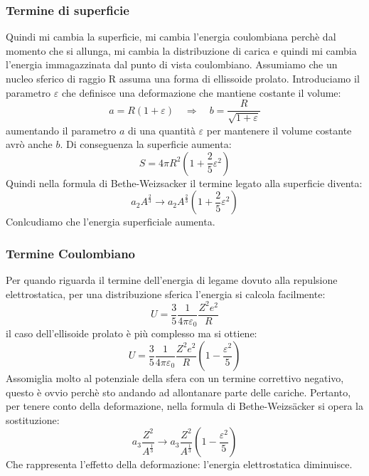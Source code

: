 \subsubsection{Termine di superficie}
Quindi mi cambia la superficie, mi cambia l'energia coulombiana perchè dal momento che si allunga, mi cambia la distribuzione di carica e quindi mi cambia l'energia immagazzinata dal punto di vista coulombiano.
Assumiamo che un nucleo sferico di raggio R assuma una forma di ellissoide prolato. Introduciamo il parametro $\varepsilon$ che definisce una deformazione che mantiene costante il volume:
\begin{equation*}
    a=R(1+\varepsilon) \quad \Rightarrow \quad b=\frac{R}{\sqrt{1+\varepsilon}}
\end{equation*}
aumentando il parametro $a$ di una quantità $\varepsilon$ per mantenere il volume costante avrò anche $b$. Di conseguenza la superficie aumenta:
\begin{equation*}
    S=4\pi R^2\left(1+\frac{2}{5}\varepsilon^2\right)
\end{equation*}
Quindi nella formula di Bethe-Weizsacker il termine legato alla superficie diventa:
\begin{equation*}
    a_2A^{\frac{2}{3}} \rightarrow a_2A^{\frac{2}{3}}\left(1+\frac{2}{5}\varepsilon^2\right)
\end{equation*}Conlcudiamo che l'energia superficiale aumenta.
\subsubsection{Termine Coulombiano}
Per quando riguarda il termine dell'energia di legame dovuto alla repulsione elettrostatica, per una distribuzione sferica l'energia si calcola facilmente:
\begin{equation*}
    U=\frac{3}{5}\frac{1}{4\pi\varepsilon_0}\frac{Z^2e^2}{R}
\end{equation*}
il caso dell'ellisoide prolato è più complesso ma si ottiene:
\begin{equation*}
    U=\frac{3}{5}\frac{1}{4\pi\varepsilon_0}\frac{Z^2e^2}{R}\left(1-\frac{\varepsilon^2}{5}\right)
\end{equation*}
Assomiglia molto al potenziale della sfera con un termine correttivo negativo, questo è ovvio perchè sto andando ad allontanare parte delle cariche. Pertanto, per tenere conto della deformazione, nella formula di Bethe-Weizs\"acker si opera la sostituzione:
\begin{equation*}
    a_3\frac{Z^2}{A^{\frac{1}{3}}}\rightarrow a_3\frac{Z^2}{A^{\frac{1}{3}}}\left(1-\frac{\varepsilon^2}{5}\right)
\end{equation*}
Che rappresenta l'effetto della deformazione: l'energia elettrostatica diminuisce.
